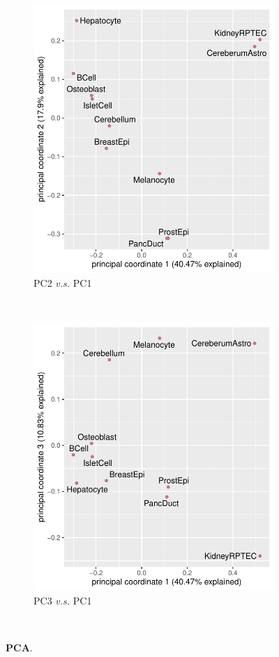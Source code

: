 \begin{figure}[h!]
    \begin{subfigure}{.5\textwidth}
    \centering
    \includegraphics[scale=0.7]{graphics/encode_pca_1_2.pdf}
    \caption{PC2 \textit{v.s.} PC1}
    \end{subfigure}
    ~
    \begin{subfigure}{.5\textwidth}
    \centering
    \includegraphics[scale=0.7]{graphics/encode_pca_1_3.pdf}
    \caption{PC3 \textit{v.s.} PC1}
    \end{subfigure} \\
    \caption{\textbf{PCA}.}
    \label{fig:encode_pca}
\end{figure}